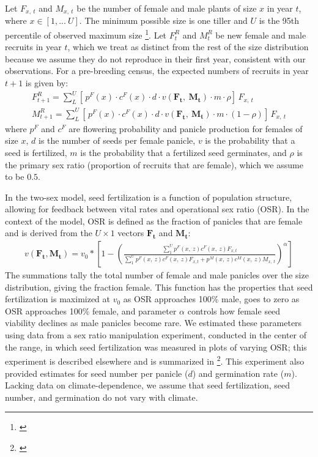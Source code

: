 \documentclass[12pt]{article}\usepackage[]{graphicx}\usepackage[dvipsnames]{xcolor}
\newcommand{\tom}[2]{{\color{red}{#1}}\footnote{\textit{\color{red}{#2}}}}
\begin{document}
Let $F_{x,\ t}$ and $M_{x,\ t}$ be the number of female and male plants of size $x$ in year $t$, where $x \in [1,...\ U]$.
The minimum possible size is one tiller and $U$ is the 95th percentile of observed maximum size \tom{(\# tillers)}{Give this number.}.
Let $F^{R}_{t}$ and $M^{R}_{t}$ be new female and male recruits in year $t$, which we treat as distinct from the rest of the size distribution because we assume they do not reproduce in their first year, consistent with our observations.
For a pre-breeding census, the expected numbers of recruits in year $t+1$ is given by:
\begin{align}\label{eq:recruits}
F^{R}_{t+1} = \sum_{L}^{U} 	[ \, p^{F}(x) \cdot c^{F}(x) \cdot d \cdot v(\mathbf{F_{t}},\ \mathbf{M_{t}}) \cdot m \cdot \rho 	] \, F_{x,\ t}
\\
M^{R}_{t+1} = \sum_{L}^{U} 	[ \, p^{F}(x) \cdot c^{F}(x) \cdot d \cdot v(\mathbf{F_{t}},\ \mathbf{M_{t}}) \cdot m \cdot (1-\rho) 	] \, F_{x,\ t}
\end{align}
\noindent where $p^{F}$ and $c^{F}$ are flowering probability and panicle production for females of size $x$, $d$ is the number of seeds per female panicle, $v$ is the probability that a seed is fertilized, $m$ is the probability that a fertilized seed germinates, and $\rho$ is the primary sex ratio (proportion of recruits that are female), which we assume to be $0.5$. 

In the two-sex model, seed fertilization is a function of population structure, allowing for feedback between vital rates and operational sex ratio (OSR). 
In the context of the model, OSR is defined as the fraction of panicles that are female and is derived from the $U \times 1$ vectors $\mathbf{F_{t}}$ and $\mathbf{M_{t}}$:
\begin{align}\label{eq:viab_MPM}
	v(\mathbf{F_{t}},\mathbf{M_{t}}) = v_{0} * \left[ 1 - \left( \frac{\sum_{1}^{U} p^{F}(x,\ z) c^{F}(x,\ z) F_{x,t}}{\sum_{1}^{U} p^{F}(x,\ z) c^{F}(x,\ z) F_{x,t} + p^{M}(x,\ z) c^{M}(x,\ z) M_{x,\ t}} \right) ^{\alpha}\right]
\end{align}
The summations tally the total number of female and male panicles over the size distribution, giving the fraction female. 
This function has the properties that seed fertilization is maximized at $v_{0}$ as OSR approaches 100\% male, goes to zero as OSR approaches 100\% female, and parameter $\alpha$ controls how female seed viability declines as male panicles become rare. 
We estimated these parameters using data from a sex ratio manipulation experiment, conducted in the center of the range, in which seed fertilization was measured in plots of varying OSR; this experiment is described elsewhere  \citep{compagnoni2017can} and is summarized in \tom{Supplementary Method \ref{sec:experiment}}{I think the supplement should also include a data figure showing the fit of the model to the experimental data.}. 
This experiment also provided estimates for seed number per panicle ($d$) and germination rate ($m$). 
Lacking data on climate-dependence, we assume that seed fertilization, seed number, and germination do not vary with climate.  
\end{document}
